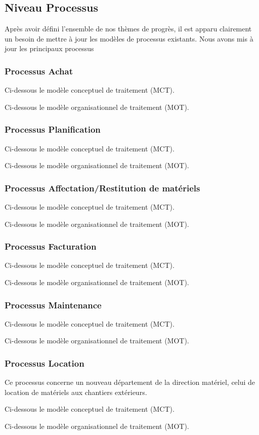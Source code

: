         \subsection{Niveau Processus}
        Après avoir défini l'ensemble de nos thèmes de progrès, il est apparu clairement un besoin de mettre à jour les modèles de processus existants. Nous avons mis à jour les principaux processus

                \subsubsection{Processus Achat}
                Ci-dessous le modèle conceptuel de traitement (MCT).


                Ci-dessous le modèle organisationnel de traitement (MOT).

                \subsubsection{Processus Planification}
                Ci-dessous le modèle conceptuel de traitement (MCT).


                Ci-dessous le modèle organisationnel de traitement (MOT).

                \subsubsection{Processus Affectation/Restitution de matériels}
                Ci-dessous le modèle conceptuel de traitement (MCT).


                Ci-dessous le modèle organisationnel de traitement (MOT).

                \subsubsection{Processus Facturation}
                Ci-dessous le modèle conceptuel de traitement (MCT).


                Ci-dessous le modèle organisationnel de traitement (MOT).


                \subsubsection{Processus Maintenance}
                Ci-dessous le modèle conceptuel de traitement (MCT).


                Ci-dessous le modèle organisationnel de traitement (MOT).

                \subsubsection{Processus Location}
                Ce processus concerne un nouveau département de la direction matériel, celui de location de matériels aux chantiers extérieurs.

                Ci-dessous le modèle conceptuel de traitement (MCT).


                Ci-dessous le modèle organisationnel de traitement (MOT).

